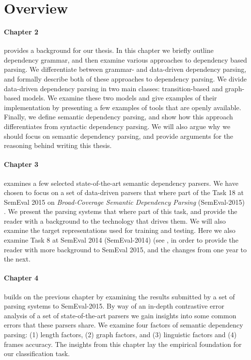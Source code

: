 \section{Overview} 

\paragraph{Chapter 2} provides a background for our thesis. In this chapter we briefly outline dependency grammar, and then examine various approaches to dependency based parsing. We differentiate between grammar- and data-driven dependency parsing, and formally describe both of these approaches to dependency parsing. We divide data-driven dependency parsing in two main classes: transition-based and graph-based models. We examine these two models and give examples of their implementation by presenting a few examples of tools that are openly available. Finally, we define semantic dependency parsing, and show how this approach differentiates from syntactic dependency parsing. We will also argue why we should focus on semantic dependency parsing, and provide arguments for the reasoning behind writing this thesis.

\paragraph{Chapter 3} examines a few selected state-of-the-art semantic dependency parsers. We have chosen to focus on a set of data-driven parsers that where part of the Task 18 at SemEval 2015 on \textit{Broad-Coverage Semantic Dependency Parsing} (SemEval-2015) \cite{Oepen:15}. We present the parsing systems that where part of this task, and provide the reader with a background to the technology that drives them. We will also examine the target representations used for training and testing. Here we also examine Task 8 at SemEval 2014 (SemEval-2014) (see , in order to provide the reader with more background to SemEval 2015, and the changes from one year to the next.

\paragraph{Chapter 4} builds on the previous chapter by examining the results submitted by a set of parsing systems to SemEval-2015. By way of an in-depth contrastive error analysis of a set of state-of-the-art parsers we gain insights into some common errors that these parsers share. We examine four factors of semantic dependency parsing: (1) length factors, (2) graph factors, and (3) linguistic factors and (4) frames accuracy. The insights from this chapter lay the empirical foundation for our classification task.

